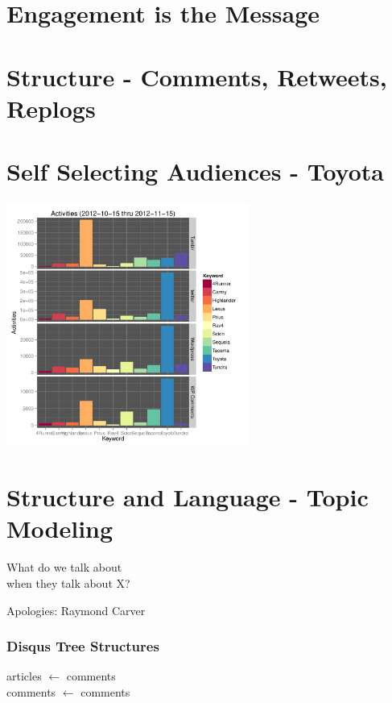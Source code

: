 \documentclass{beamer}
\begin{document}
\section{Engagement is the Message}

\section{Structure - Comments, Retweets, Replogs}

\section{Self Selecting Audiences - Toyota}

\begin{frame}
  \begin{center}
    \includegraphics[width=8cm]{./imgs/TOY_bars.pdf}
  \end{center}
\end{frame}

\section{Structure and Language - Topic Modeling}

\begin{frame}
\begin{center}
{\Huge What do we talk about \\ [15pt] when they talk about X?} 
\end{center}
\hfill Apologies: Raymond Carver \\
\end{frame}

\begin{frame}\frametitle{Disqus Tree Structures}
\begin{center}
{\Huge articles $\leftarrow$ comments \\ [20 pt] comments $\leftarrow$ comments}
\end{center}
\end{frame}
\end{document}
